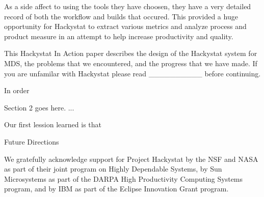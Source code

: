 \documentclass[11pt,twocolumn]{article}
\begin{document}
As a side affect to using the tools they have choosen, they have a very detailed record
of both the workflow and builds that occured. This provided a huge opportunity for Hackystat
to extract various metrics and analyze process and product measure in an attempt to help
increase productivity and quality.

This Hackystat In Action paper describes the design of the Hackystat system for MDS, the 
problems that we encountered, and the progress that we have made. If you are unfamilar 
with Hackystat please read __________ before continuing.

In order 



Section 2 goes here. ...


Our first lession learned is that


Future Directions


We gratefully acknowledge support for Project Hackystat by the NSF and NASA
as part of their joint program on Highly Dependable Systems, by Sun
Microsystems as part of the DARPA High Productivity Computing Systems
program, and by IBM as part of the Eclipse Innovation Grant program.




\end{document}
